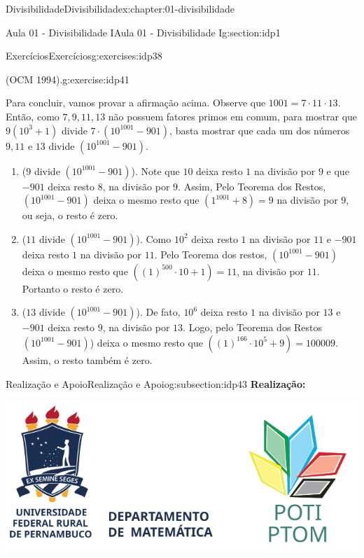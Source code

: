 \documentclass[oneside,10pt,]{book}
\newcommand{\terminology}[1]{\textbf{#1}}
\numberwithin{equation}{section}
\begin{document}
\begin{chapterptx}{Divisibilidade}{}{Divisibilidade}{}{}{x:chapter:01-divisibilidade}
\begin{sectionptx}{Aula 01 - Divisibilidade I}{}{Aula 01 - Divisibilidade I}{}{}{g:section:idp1}
\begin{exercises-subsection}{Exercícios}{}{Exercícios}{}{}{g:exercises:idp38}
\begin{divisionexercise}{3}{(OCM 1994).}{}{g:exercise:idp41}
%
\par
Para concluir, vamos provar a afirmação acima. Observe que \(1001=7\cdot11\cdot13\). Então, como \(7, 9, 11, 13\) não possuem fatores primos em comum, para mostrar que \(9(10^3+1)\) divide \(7\cdot(10^{1001}-901)\), basta mostrar que cada um dos números \(9, 11\) e \(13\) divide \((10^{1001}-901)\).%
\par
%
\begin{enumerate}[label=\roman*]
\item{}(\(9\) divide \((10^{1001}-901)\)). Note que \(10\) deixa resto \(1\) na divisão por \(9\) e que \(-901\) deixa resto \(8\), na divisão por \(9\). Assim, Pelo Teorema dos Restos, \((10^{1001}-901)\) deixa o mesmo resto que \((1^{1001}+8)=9\) na divisão por \(9\), ou seja, o resto é zero.%
\item{}(\(11\) divide \((10^{1001}-901)\)). Como \(10^2\) deixa resto \(1\) na divisão por \(11\) e \(-901\) deixa resto \(1\) na divisão por \(11\). Pelo Teorema dos restos, \((10^{1001}-901)\) deixa o mesmo resto que \(((1)^{500}\cdot10+1)=11\), na divisão por \(11\). Portanto o resto é zero.%
\item{}(\(13\) divide \((10^{1001}-901)\)). De fato, \(10^6\) deixa resto \(1\) na divisão por \(13\) e \(-901\) deixa resto \(9\), na divisão por \(13\). Logo, pelo Teorema dos Restos \((10^{1001}-901)\)) deixa o mesmo resto que \(((1)^{166}\cdot 10^5+9)=100009\). Assim, o resto também é zero.%
\end{enumerate}
%
\end{divisionexercise}%
\end{exercises-subsection}
%
%
\typeout{************************************************}
\typeout{************************************************}
%
\begin{subsectionptx}{Realização e Apoio}{}{Realização e Apoio}{}{}{g:subsection:idp43}
\terminology{Realização:}%
\begin{image}{0.3}{0.4}{0.3}%
\includegraphics[width=\linewidth]{images/realizacao}

\end{image}
\end{subsectionptx}
\end{sectionptx}
\end{chapterptx}
\end{document}
